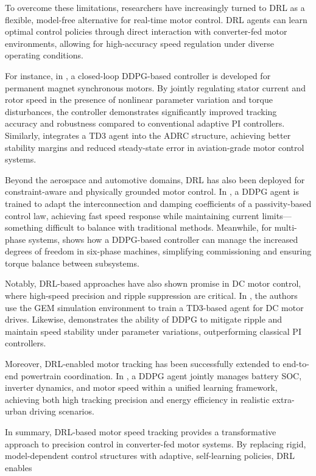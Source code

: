 To overcome these limitations, researchers have increasingly turned to DRL as a flexible, model-free alternative for real-time motor control. DRL agents can learn optimal control policies through direct interaction with converter-fed motor environments, allowing for high-accuracy speed regulation under diverse operating conditions.

For instance, in \cite{bhattacharjee2022real}, a closed-loop DDPG-based controller is developed for permanent magnet synchronous motors. By jointly regulating stator current and rotor speed in the presence of nonlinear parameter variation and torque disturbances, the controller demonstrates significantly improved tracking accuracy and robustness compared to conventional adaptive PI controllers. Similarly, \cite{wang2023novel} integrates a TD3 agent into the ADRC structure, achieving better stability margins and reduced steady-state error in aviation-grade motor control systems.

Beyond the aerospace and automotive domains, DRL has also been deployed for constraint-aware and physically grounded motor control. In \cite{wang2024current}, a DDPG agent is trained to adapt the interconnection and damping coefficients of a passivity-based control law, achieving fast speed response while maintaining current limits—something difficult to balance with traditional methods. Meanwhile, for multi-phase systems, \cite{broghammer2023reinforcement} shows how a DDPG-based controller can manage the increased degrees of freedom in six-phase machines, simplifying commissioning and ensuring torque balance between subsystems.

Notably, DRL-based approaches have also shown promise in DC motor control, where high-speed precision and ripple suppression are critical. In \cite{cosmin2023reinforcement}, the authors use the GEM simulation environment to train a TD3-based agent for DC motor drives. Likewise, \cite{anugula2021deep} demonstrates the ability of DDPG to mitigate ripple and maintain speed stability under parameter variations, outperforming classical PI controllers.

Moreover, DRL-enabled motor tracking has been successfully extended to end-to-end powertrain coordination. In \cite{basile2024sustainable}, a DDPG agent jointly manages battery SOC, inverter dynamics, and motor speed within a unified learning framework, achieving both high tracking precision and energy efficiency in realistic extra-urban driving scenarios.

In summary, DRL-based motor speed tracking provides a transformative approach to precision control in converter-fed motor systems. By replacing rigid, model-dependent control structures with adaptive, self-learning policies, DRL enables 

